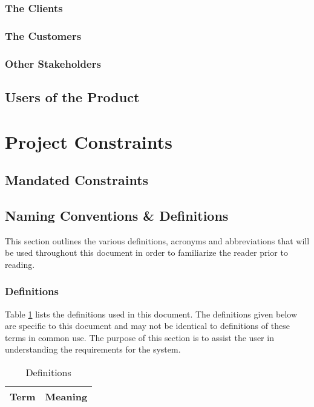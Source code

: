 \documentclass[titlepage]{article}
\begin{document}
\subsubsection{The Clients}


\subsubsection{The Customers}

\subsubsection{Other Stakeholders}

\subsection{Users of the Product}


\section{Project Constraints}
\subsection{Mandated Constraints}

\subsection{Naming Conventions \& Definitions}
This section outlines the various definitions, acronyms and abbreviations that will be used throughout this document in order to familiarize the reader prior to reading.
\subsubsection{Definitions}
Table \ref{tab:Definitions} lists the definitions used in this document. The definitions given below are specific to this document and may not be identical to definitions of these terms in common use. The purpose of this section is to assist the user in understanding the requirements for the system.
\begin{table}[h!]
\centering
\caption{Definitions}
    \begin{tabular}{| p{6cm} | p{6cm} |}    \hline
    \textbf{Term} &\textbf{Meaning}\\ \hline
    \end{tabular}
\label{tab:Definitions}
\end{table}
\end{document}

